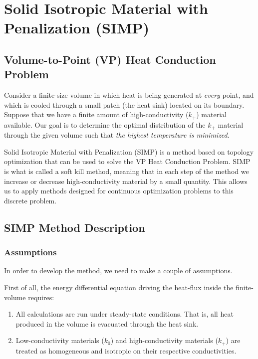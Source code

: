 \section{Solid Isotropic Material with Penalization (SIMP)}

\subsection*{Volume-to-Point (VP) Heat Conduction Problem}

Consider a finite-size volume in which heat is being generated at \textit{every} point, and which is cooled through a small patch (the heat sink) located on its boundary. Suppose that we have a finite amount of high-conductivity ($k_+$) material available. Our goal is to determine the optimal distribution of the $k_+$ material through the given volume such that \textit{the highest temperature is minimized}.

Solid Isotropic Material with Penalization (SIMP) is a method based on topology optimization that can be used to solve the VP Heat Conduction Problem. SIMP is what is called a soft kill method, meaning that in each step of the method we increase or decrease high-conductivity material by a small quantity. This allows us to apply methods designed for continuous optimization problems to this discrete problem.

\subsection{SIMP Method Description}

\subsubsection*{Assumptions}
In order to develop the method, we need to make a couple of assumptions.

First of all, the energy differential equation driving the heat-flux inside the finite-volume requires:
\begin{enumerate}
	\item All calculations are run under steady-state conditions. That is, all heat produced in the volume is evacuated through the heat sink.
	\item Low-conductivity materials ($k_0$) and high-conductivity materials ($k_+$) are treated as homogeneous and isotropic on their respective conductivities.
\end{enumerate}

